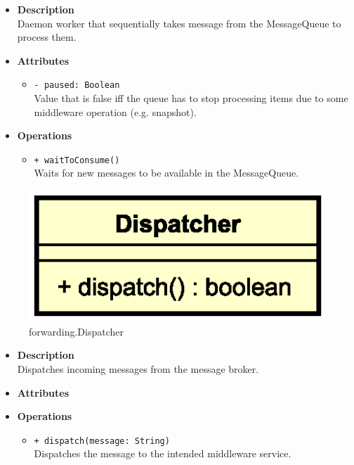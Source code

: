 \FloatBarrier
\begin{itemize}
  \item \textbf{Description} \\
    Daemon worker that sequentially takes message from the MessageQueue to
    process them.
  \item \textbf{Attributes}
    \begin{itemize}
      \item \texttt{- paused: Boolean} \\
        Value that is false iff the queue has to stop processing items due to
        some middleware operation (e.g. snapshot).
    \end{itemize}
  \item \textbf{Operations}
  \begin{itemize}
    \item \texttt{+ waitToConsume()} \\
    Waits for new messages to be available in the MessageQueue.
  \end{itemize}
\end{itemize}


\begin{figure}[H]
  \centering
  \includegraphics[width=.4\columnwidth]{images/solution/mw/fwd/disp.eps}
  \caption{forwarding.Dispatcher}
  \label{fig:mw-forwarding-dispatcher}
\end{figure}

\FloatBarrier
\begin{itemize}
  \item \textbf{Description} \\
    Dispatches incoming messages from the message broker.
  \item \textbf{Attributes}
  \item \textbf{Operations}
  \begin{itemize}
    \item \texttt{+ dispatch(message: String)} \\
    Dispatches the message to the intended middleware service.
  \end{itemize}
\end{itemize}

